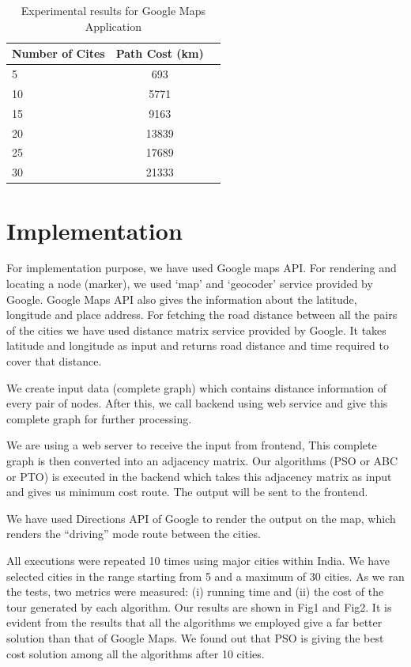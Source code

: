 \documentclass[conference]{IEEEtran}
\begin{document}
\begin{table}[h!]
  \begin{center}
    \label{tab:table4}
    \begin{tabular}{l|c|r}
      \textbf{Number of Cites} & \textbf{Path Cost (km)}\\
      \hline
      5 & 693\\
      10 & 5771\\
      15 & 9163\\
      20 & 13839\\ 
      25 & 17689\\
      30 & 21333\\
    \end{tabular}
    \caption{Experimental results for Google Maps Application}
  \end{center}
\end{table}


\section {Implementation}
For implementation purpose, we have used Google maps API. For rendering and locating a node (marker), we used ‘map’ and ‘geocoder’ service provided by Google. Google Maps API also gives the information about the latitude, longitude and place address. For fetching the road distance between all the pairs of the cities we have used distance matrix service provided by Google. It takes latitude and longitude as input and returns road distance and time required to cover that distance.

We create input data (complete graph) which contains distance information of every pair of nodes. After this, we call backend using web service and give this complete graph for further processing.

We are using a web server to receive the input from frontend, This complete graph is then converted into an adjacency matrix. Our algorithms (PSO or ABC or PTO) is executed in the backend which takes this adjacency matrix as input and gives us minimum cost route. The output will be sent to the frontend.

We have used Directions API of Google to render the output on the map, which renders the “driving” mode route between the cities.

All executions were repeated 10 times using major cities within India. We have selected cities in the range starting from 5 and a maximum of 30 cities. As we ran the tests, two metrics were measured: (i) running time and (ii) the cost of the tour generated by each algorithm. Our results are shown in Fig1 and Fig2. It is evident from the results that all the algorithms we employed give a far better solution than that of Google Maps. We found out that PSO is giving the best cost solution among all the algorithms after 10 cities.
\end{document}
